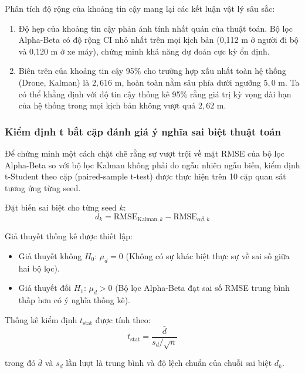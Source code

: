 Phân tích độ rộng của khoảng tin cậy mang lại các kết luận vật lý sâu sắc:
\begin{enumerate}
    \item Độ hẹp của khoảng tin cậy phản ánh tính nhất quán của thuật toán. Bộ lọc Alpha-Beta có độ rộng CI nhỏ nhất trên mọi kịch bản (0,112 m ở người đi bộ và 0,120 m ở xe máy), chứng minh khả năng dự đoán cực kỳ ổn định.
    \item Biên trên của khoảng tin cậy 95\% cho trường hợp xấu nhất toàn hệ thống (Drone, Kalman) là $2{,}616$ m, hoàn toàn nằm sâu phía dưới ngưỡng $5{,}0$ m. Ta có thể khẳng định với độ tin cậy thống kê 95\% rằng giá trị kỳ vọng dài hạn của hệ thống trong mọi kịch bản không vượt quá $2{,}62$ m.
\end{enumerate}

\subsubsection{Kiểm định t bắt cặp đánh giá ý nghĩa sai biệt thuật toán}

\hspace{0.5cm} Để chứng minh một cách chặt chẽ rằng sự vượt trội về mặt RMSE của bộ lọc Alpha-Beta so với bộ lọc Kalman không phải do ngẫu nhiên ngẫu biến, kiểm định t-Student theo cặp (paired-sample t-test) được thực hiện trên 10 cặp quan sát tương ứng từng seed.

Đặt biến sai biệt cho từng seed $k$:
\begin{equation}
d_k = \text{RMSE}_{\text{Kalman}, k} - \text{RMSE}_{\alpha\beta, k}
\label{eq:paired-diff}
\end{equation}

Giả thuyết thống kê được thiết lập:
\begin{itemize}
    \item Giả thuyết không $H_0$: $\mu_d = 0$ (Không có sự khác biệt thực sự về sai số giữa hai bộ lọc).
    \item Giả thuyết đối $H_1$: $\mu_d > 0$ (Bộ lọc Alpha-Beta đạt sai số RMSE trung bình thấp hơn có ý nghĩa thống kê).
\end{itemize}

Thống kê kiểm định $t_{\text{stat}}$ được tính theo:
\begin{equation}
t_{\text{stat}} = \frac{\bar{d}}{s_d / \sqrt{n}}
\label{eq:t-stat}
\end{equation}

trong đó $\bar{d}$ và $s_d$ lần lượt là trung bình và độ lệch chuẩn của chuỗi sai biệt $d_k$.

